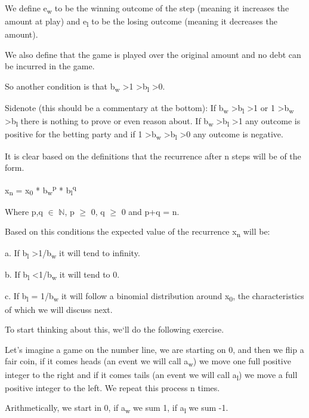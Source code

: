 \documentclass[12pt,reqno]{amsart}
\begin{document}
We define e\textsubscript{w} to be the winning outcome of the step (meaning it increases the amount at play) and e\textsubscript{l} to be the losing outcome (meaning it decreases the amount). 

We also define that the game is played over the original amount and no debt can be incurred in the game.

So another condition is that b\textsubscript{w} \textgreater 1 \textgreater b\textsubscript{l} \textgreater 0.

Sidenote (this should be a commentary at the bottom): If b\textsubscript{w} \textgreater b\textsubscript{l} \textgreater 1 or 1 \textgreater b\textsubscript{w} \textgreater b\textsubscript{l} there is nothing to prove or even reason about. If b\textsubscript{w} \textgreater b\textsubscript{l} \textgreater 1 any outcome is positive for the betting party and if 1 \textgreater b\textsubscript{w} \textgreater b\textsubscript{l} \textgreater 0 any outcome is negative. 

It is clear based on the definitions that the recurrence after n steps will be of the form.

x\textsubscript{n} = x\textsubscript{0} * b\textsubscript{w}\textsuperscript{p} * b\textsubscript{l}\textsuperscript{q}

Where p,q $\in$ $\mathbb{N}$, p $\geq$ 0, q $\geq$ 0 and p+q = n.  

Based on this conditions the expected value of the recurrence x\textsubscript{n} will be:

a. If b\textsubscript{l} \textgreater 1/b\textsubscript{w} it will tend to infinity.

b. If b\textsubscript{l} \textless 1/b\textsubscript{w} it will tend to 0.

c. If b\textsubscript{l} = 1/b\textsubscript{w} it will follow a binomial distribution around x\textsubscript{0}, the characteristics of which we will discuss next.

To start thinking about this, we`ll do the following exercise. 

Let's imagine a game on the number line, we are starting on 0, and then we flip a fair coin, if it comes heads (an event we will call a\textsubscript{w}) we move one full positive integer to the right and if it comes tails (an event we will call a\textsubscript{l}) we move a full positive integer to the left. We repeat this process n times.

Arithmetically, we start in 0, if a\textsubscript{w} we sum 1, if a\textsubscript{l} we sum -1.
\end{document}
